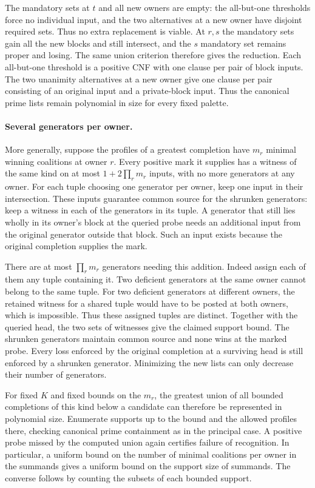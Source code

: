The mandatory sets at $t$ and all new owners are empty:
the all-but-one thresholds force no individual input, and
the two alternatives at a new owner have disjoint required
sets. Thus no extra replacement is viable. At $r,s$ the
mandatory sets gain all the new blocks and still intersect,
and the $s$ mandatory set remains proper and losing.
The same union criterion therefore gives the reduction.
Each all-but-one threshold is a positive CNF with one
clause per pair of block inputs. The two unanimity
alternatives at a new owner give one clause per pair
consisting of an original input and a private-block input.
Thus the canonical prime lists remain polynomial in size
for every fixed palette.

\paragraph{Several generators per owner.}
More generally, suppose the profiles of a greatest completion
have $m_r$ minimal winning coalitions at owner $r$. Every positive
mark it supplies has a witness of the same kind on at most
$1+2\prod_r m_r$ inputs, with no more generators at any owner.
For each tuple choosing one generator per owner, keep one input
in their intersection. These inputs guarantee common source for
the shrunken generators: keep a witness in each of the generators
in its tuple. A generator that still lies wholly in its owner's
block at the queried probe needs an additional input from the
original generator outside that block. Such an input exists
because the original completion supplies the mark.

There are at most $\prod_r m_r$ generators needing this addition.
Indeed assign each of them any tuple containing it. Two deficient
generators at the same owner cannot belong to the same tuple.
For two deficient generators at different owners, the retained
witness for a shared tuple would have to be posted at both owners,
which is impossible. Thus these assigned tuples are distinct.
Together with the queried head, the two sets of witnesses give
the claimed support bound. The shrunken generators maintain
common source and none wins at the marked probe. Every loss
enforced by the original completion at a surviving head is still
enforced by a shrunken generator. Minimizing the new lists can
only decrease their number of generators.

For fixed $K$ and fixed bounds on the $m_r$, the greatest union
of all bounded completions of this kind below a candidate can
therefore be represented in polynomial size. Enumerate supports
up to the bound and the allowed profiles there, checking canonical
prime containment as in the principal case. A positive probe
missed by the computed union again certifies failure of recognition.
In particular, a uniform bound on the number of minimal coalitions
per owner in the summands gives a uniform bound on the support size
of summands. The converse follows by counting the subsets of each
bounded support.

